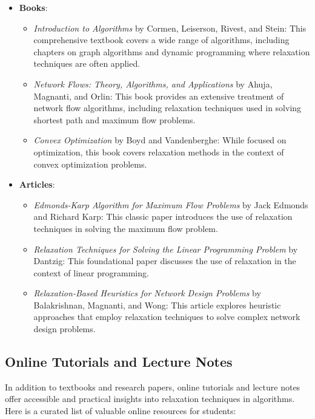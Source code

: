 \documentclass[12pt]{book} %
\begin{document}
\begin{itemize}
    \item \textbf{Books}:
        \begin{itemize}
            \item \textit{Introduction to Algorithms} by Cormen, Leiserson, Rivest, and Stein: This comprehensive textbook covers a wide range of algorithms, including chapters on graph algorithms and dynamic programming where relaxation techniques are often applied.
            \item \textit{Network Flows: Theory, Algorithms, and Applications} by Ahuja, Magnanti, and Orlin: This book provides an extensive treatment of network flow algorithms, including relaxation techniques used in solving shortest path and maximum flow problems.
            \item \textit{Convex Optimization} by Boyd and Vandenberghe: While focused on optimization, this book covers relaxation methods in the context of convex optimization problems.
        \end{itemize}
    \item \textbf{Articles}:
        \begin{itemize}
            \item \textit{Edmonds-Karp Algorithm for Maximum Flow Problems} by Jack Edmonds and Richard Karp: This classic paper introduces the use of relaxation techniques in solving the maximum flow problem.
            \item \textit{Relaxation Techniques for Solving the Linear Programming Problem} by Dantzig: This foundational paper discusses the use of relaxation in the context of linear programming.
            \item \textit{Relaxation-Based Heuristics for Network Design Problems} by Balakrishnan, Magnanti, and Wong: This article explores heuristic approaches that employ relaxation techniques to solve complex network design problems.
        \end{itemize}
\end{itemize}

\subsection{Online Tutorials and Lecture Notes}
In addition to textbooks and research papers, online tutorials and lecture notes offer accessible and practical insights into relaxation techniques in algorithms. Here is a curated list of valuable online resources for students:
\end{document}
